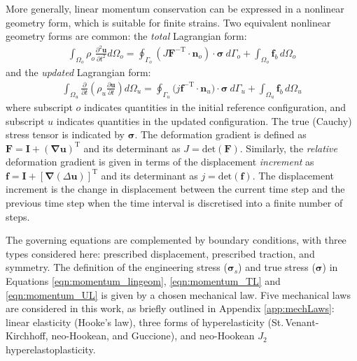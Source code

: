 \documentclass[sn-mathphys,Numbered]{sn-jnl}%
\newcommand{\bb}{\boldsymbol}
\begin{document}
More generally,  linear momentum conservation can be expressed in a nonlinear geometry form, which is suitable for finite strains.
Two equivalent nonlinear geometry forms are common: the \emph{total} Lagrangian form:
\begin{eqnarray} \label{eqn:momentum_TL}
    \int_{\Omega_o} \rho_o \frac{\partial^2 \bb{u} }{\partial t^2} d\Omega_o
    =
    \oint_{\Gamma_o} \left( J \bb{F}^{-\text{T}} \cdot \bb{n}_o \right) \cdot \bb{\sigma} \ d\Gamma_o
    + \int_{\Omega_o}  \bb{f}_b \, d\Omega_o
\end{eqnarray}
and the \emph{updated} Lagrangian form:
\begin{eqnarray} \label{eqn:momentum_UL}
    \int_{\Omega_u} \frac{\partial }{\partial t} \left( \rho_u \frac{\partial \bb{u} }{\partial t} \right) d\Omega_u
    = \oint_{\Gamma_u}(j\bb{f}^{-\text{T}}\cdot{\bb{n}_u)\cdot \bb{\sigma}}\ d\Gamma_u
    + \int_{\Omega_u}  \bb{f}_b \, d\Omega_u
\end{eqnarray}
where subscript $o$ indicates quantities in the initial reference configuration, and subscript $u$ indicates quantities in the updated configuration.
The true (Cauchy) stress tensor is indicated by $\bb{\sigma}$.
The deformation gradient is defined as $\bb{F} = \textbf{I} + (\bb{\nabla} \bb{u})^{\text{T}}$ and its determinant as $J = \text{det}(\bb{F})$.
Similarly, the \emph{relative} deformation gradient is given in terms of the displacement \emph{increment} as $\bb{f}=\textbf{I} + \left[\bb{\nabla}(\Delta \bb{u}) \right]^{\text{T}}$ and its determinant as $j = \text{det}(\bb{f})$.
The displacement increment is the change in displacement between the current time step and the previous time step when the time interval is discretised into a finite number of steps.



The governing equations are complemented by boundary conditions, with three types considered here: prescribed displacement, prescribed traction, and symmetry.
The definition of the engineering stress ($\bb{\sigma}_s$) and true stress ($\bb{\sigma}$) in Equations \ref{eqn:momentum_lingeom}, \ref{eqn:momentum_TL} and \ref{eqn:momentum_UL} is given by a chosen mechanical law.
Five mechanical laws are considered in this work, as briefly outlined in Appendix \ref{app:mechLaws}: linear elasticity (Hooke's law), three forms of hyperelasticity (St.\,Venant-Kirchhoff, neo-Hookean, and Guccione), and neo-Hookean $J_2$ hyperelastoplasticity.
\end{document}
